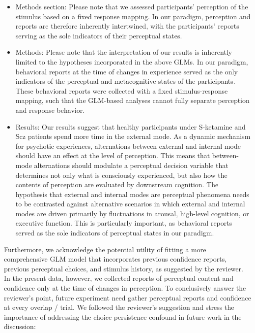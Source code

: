 \documentclass[
]{article}
\begin{document}
\begin{itemize}
\item
  Methods section: Please note that we assessed participants' perception
  of the stimulus based on a fixed response mapping. In our paradigm,
  perception and reports are therefore inherently intertwined, with the
  participants' reports serving as the sole indicators of their
  perceptual states.
\item
  Methods: Please note that the interpretation of our results is
  inherently limited to the hypotheses incorporated in the above GLMs.
  In our paradigm, behavioral reports at the time of changes in
  experience served as the only indicators of the perceptual and
  metacognitive states of the participants. These behavioral reports
  were collected with a fixed stimulus-response mapping, such that the
  GLM-based analyses cannot fully separate perception and response
  behavior.
\item
  Results: Our results suggest that healthy participants under
  S-ketamine and Scz patients spend more time in the external mode. As a
  dynamic mechanism for psychotic experiences, alternations between
  external and internal mode should have an effect at the level of
  perception. This means that between-mode alternations should modulate
  a perceptual decision variable that determines not only what is
  consciously experienced, but also how the contents of perception are
  evaluated by downstream cognition. The hypothesis that external and
  internal modes are perceptual phenomena needs to be contrasted against
  alternative scenarios in which external and internal modes are driven
  primarily by fluctuations in arousal, high-level cognition, or
  executive function. This is particularly important, as behavioral
  reports served as the sole indicators of perceptual states in our
  paradigm.
\end{itemize}

Furthermore, we acknowledge the potential utility of fitting a more
comprehensive GLM model that incorporates previous confidence reports,
previous perceptual choices, and stimulus history, as suggested by the
reviewer. In the present data, however, we collected reports of
perceptual content and confidence only at the time of changes in
perception. To conclusively answer the reviewer's point, future
experiment need gather perceptual reports and confidence at every
overlap / trial. We followed the reviewer's suggestion and stress the
importance of addressing the choice persistence confound in future work
in the discussion:
\end{document}
